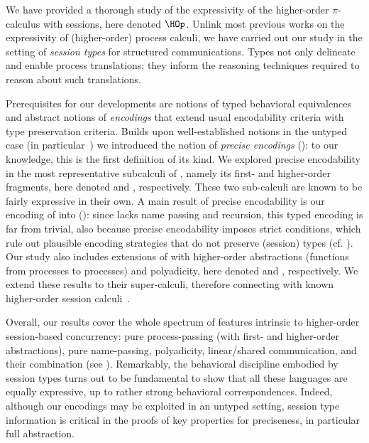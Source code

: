 
We have provided a thorough study of the expressivity of the higher-order $\pi$-calculus with sessions, here denoted $\HOp$.
Unlink most previous works on the expressivity of 
(higher-order) process calculi, we have carried out our study in the setting of \emph{session types} for structured communications.
Types not only delineate and enable process translations; they 
inform the reasoning techniques required to reason about such translations.

Prerequisites for our developments are notions of typed behavioral equivalences and abstract notions of 
\emph{encodings} that extend usual encodability criteria with type preservation criteria. 
Builds upon well-established notions in the untyped case (in particular~\cite{DBLP:journals/iandc/Gorla10})
we introduced the notion of \emph{precise  encodings} ():
to our knowledge, this is the first definition of its kind. We explored precise encodability in the most representative subcalculi of \HOp, 
namely its first- and higher-order fragments, here denoted \sessp and \HO, respectively. These two sub-calculi are known to be fairly expressive in their own. A main result of precise encodability is our encoding of \HOp into \HO ():
since \HO lacks name passing and recursion, this typed encoding is far from trivial, also because precise encodability imposes strict conditions, which rule out plausible encoding strategies that do not preserve (session) types (cf. ). Our study also includes extensions of \HOp with higher-order abstractions (functions from processes to processes) and polyadicity, here denoted \HOpp and \PHOp, respectively. We extend these results to their super-calculi, therefore connecting with known higher-order session calculi~\cite{tlca07}.

Overall, 
our results cover the whole spectrum of features intrinsic to higher-order session-based concurrency:
pure process-passing (with first- and higher-order abstractions), pure name-passing, polyadicity, 
linear/shared communication, and their combination (see ). Remarkably, 
the behavioral discipline embodied by 
session types turns out to be fundamental to show that all these languages are equally expressive, up to 
rather strong behavioral correspondences. Indeed, although our encodings may be exploited in an untyped setting,
session type information is critical in the proofs of key properties for preciseness, in particular full abstraction.
